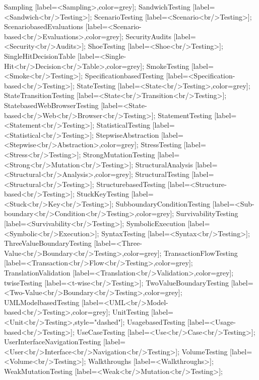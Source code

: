 \documentclass{article}
\begin{document}
{Sampling [label=<Sampling>,color=grey];
SandwichTesting [label=<Sandwich<br/>Testing>];
ScenarioTesting [label=<Scenario<br/>Testing>];
ScenariobasedEvaluations [label=<Scenario-based<br/>Evaluations>,color=grey];
SecurityAudits [label=<Security<br/>Audits>];
ShoeTesting [label=<Shoe<br/>Testing>];
SingleHitDecisionTable [label=<Single-Hit<br/>Decision<br/>Table>,color=grey];
SmokeTesting [label=<Smoke<br/>Testing>];
SpecificationbasedTesting [label=<Specification-based<br/>Testing>];
StateTesting [label=<State<br/>Testing>,color=grey];
StateTransitionTesting [label=<State<br/>Transition<br/>Testing>];
StatebasedWebBrowserTesting [label=<State-based<br/>Web<br/>Browser<br/>Testing>];
StatementTesting [label=<Statement<br/>Testing>];
StatisticalTesting [label=<Statistical<br/>Testing>];
StepwiseAbstraction [label=<Stepwise<br/>Abstraction>,color=grey];
StressTesting [label=<Stress<br/>Testing>];
StrongMutationTesting [label=<Strong<br/>Mutation<br/>Testing>];
StructuralAnalysis [label=<Structural<br/>Analysis>,color=grey];
StructuralTesting [label=<Structural<br/>Testing>];
StructurebasedTesting [label=<Structure-based<br/>Testing>];
StuckKeyTesting [label=<Stuck<br/>Key<br/>Testing>];
SubboundaryConditionTesting [label=<Sub-boundary<br/>Condition<br/>Testing>,color=grey];
SurvivabilityTesting [label=<Survivability<br/>Testing>];
SymbolicExecution [label=<Symbolic<br/>Execution>];
SyntaxTesting [label=<Syntax<br/>Testing>];
ThreeValueBoundaryTesting [label=<Three-Value<br/>Boundary<br/>Testing>,color=grey];
TransactionFlowTesting [label=<Transaction<br/>Flow<br/>Testing>,color=grey];
TranslationValidation [label=<Translation<br/>Validation>,color=grey];
twiseTesting [label=<t-wise<br/>Testing>];
TwoValueBoundaryTesting [label=<Two-Value<br/>Boundary<br/>Testing>,color=grey];
UMLModelbasedTesting [label=<UML<br/>Model-based<br/>Testing>,color=grey];
UnitTesting [label=<Unit<br/>Testing>,style="dashed"];
UsagebasedTesting [label=<Usage-based<br/>Testing>];
UseCaseTesting [label=<Use<br/>Case<br/>Testing>];
UserInterfaceNavigationTesting [label=<User<br/>Interface<br/>Navigation<br/>Testing>];
VolumeTesting [label=<Volume<br/>Testing>];
Walkthroughs [label=<Walkthroughs>];
WeakMutationTesting [label=<Weak<br/>Mutation<br/>Testing>];

}
\end{document}
